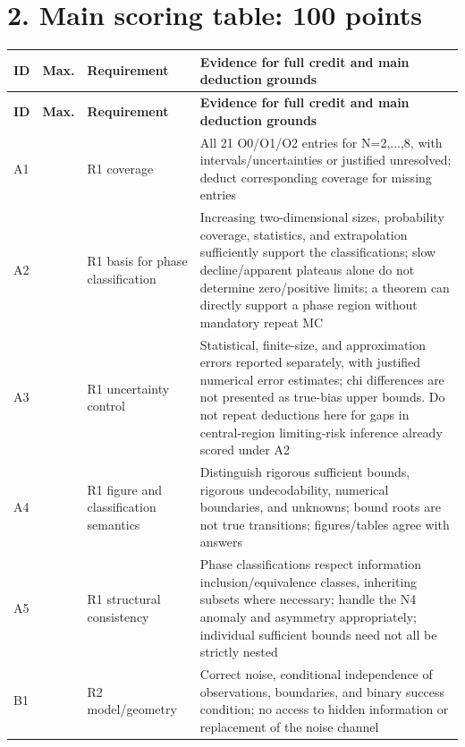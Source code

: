 \documentclass[11pt,a4paper]{article}
\begin{document}
\section*{2. Main scoring table: 100 points}

{\fontsize{9}{12.5}\selectfont
\setlength{\tabcolsep}{2.2pt}

\begin{longtable}{>{\raggedright\arraybackslash}p{}>{\raggedright\arraybackslash}p{}>{\raggedright\arraybackslash}p{}>{\raggedright\arraybackslash}p{}}
\toprule
\textbf{ID} & \textbf{Max.} & \textbf{Requirement} & \textbf{Evidence for full credit and main deduction grounds}\tabularnewline
\midrule
\endfirsthead
\toprule
\textbf{ID} & \textbf{Max.} & \textbf{Requirement} & \textbf{Evidence for full credit and main deduction grounds}\tabularnewline
\midrule
\endhead
{}A1 & 5 & R1 coverage & All 21 O0/\allowbreak{}O1/\allowbreak{}O2 entries for N=2,...,8, with intervals/\allowbreak{}uncertainties or justified unresolved; deduct corresponding coverage for missing entries\tabularnewline
{}A2 & 8 & R1 basis for phase classification & Increasing two-dimensional sizes, probability coverage, statistics, and extrapolation sufficiently support the classifications; slow decline/\allowbreak{}apparent plateaus alone do not determine zero/\allowbreak{}positive limits; a theorem can directly support a phase region without mandatory repeat MC\tabularnewline
{}A3 & 8 & R1 uncertainty control & Statistical, finite-size, and approximation errors reported separately, with justified numerical error estimates; chi differences are not presented as true-bias upper bounds. Do not repeat deductions here for gaps in central-region limiting-risk inference already scored under A2\tabularnewline
{}A4 & 5 & R1 figure and classification semantics & Distinguish rigorous sufficient bounds, rigorous undecodability, numerical boundaries, and unknowns; bound roots are not true transitions; figures/\allowbreak{}tables agree with answers\tabularnewline
{}A5 & 4 & R1 structural consistency & Phase classifications respect information inclusion/\allowbreak{}equivalence classes, inheriting subsets where necessary; handle the N4 anomaly and asymmetry appropriately; individual sufficient bounds need not all be strictly nested\tabularnewline
{}B1 & 4 & R2 model/\allowbreak{}geometry & Correct noise, conditional independence of observations, boundaries, and binary success condition; no access to hidden information or replacement of the noise channel\tabularnewline

\end{longtable}}
\end{document}
